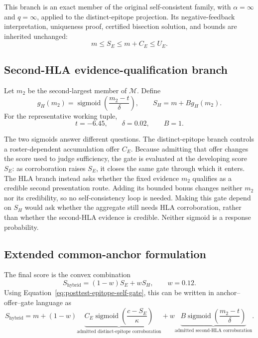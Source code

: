 \documentclass[11pt]{article}
\newcommand{\sigmoid}{\operatorname{sigmoid}}
\begin{document}
This branch is an exact member of the original self-consistent family, with
$\alpha=\infty$ and $q=\infty$, applied to the distinct-epitope projection.
Its negative-feedback interpretation, uniqueness proof, certified bisection
solution, and bounds are inherited unchanged:
\begin{equation}
m\leq S_E\leq m+C_E\leq U_E.
\label{eq:posttest-epitope-bounds}
\end{equation}

\subsection{Second-HLA evidence-qualification branch}

Let $m_2$ be the second-largest member of $\mathcal M$. Define
\begin{equation}
g_H(m_2)=\sigmoid\left(\frac{m_2-t}{\delta}\right),
\qquad
S_H=m+B g_H(m_2).
\label{eq:posttest-hla-gate}
\end{equation}
For the representative working tuple,
\begin{equation}
t=-6.45,
\qquad \delta=0.02,
\qquad B=1.
\end{equation}

The two sigmoids answer different questions. The distinct-epitope branch
controls a roster-dependent accumulation offer $C_E$. Because admitting that
offer changes the score used to judge sufficiency, the gate is evaluated at
the developing score $S_E$: as corroboration raises $S_E$, it closes the same
gate through which it enters. The HLA branch instead asks whether the fixed
evidence $m_2$ qualifies as a credible second presentation route. Adding its
bounded bonus changes neither $m_2$ nor its credibility, so no
self-consistency loop is needed. Making this gate depend on $S_H$ would ask
whether the aggregate still needs HLA corroboration, rather than whether the
second-HLA evidence is credible. Neither sigmoid is a response probability.

\subsection{Extended common-anchor formulation}

The final score is the convex combination
\begin{equation}
S_{\mathrm{hybrid}}=(1-w)S_E+wS_H,
\qquad w=0.12.
\label{eq:posttest-hybrid-convex}
\end{equation}
Using Equation~\eqref{eq:posttest-epitope-self-gate}, this can be written in
anchor--offer--gate language as
\begin{equation}
\boxed{
S_{\mathrm{hybrid}}
=m
+(1-w)\underbrace{C_E
  \sigmoid\left(\frac{c-S_E}{\kappa}\right)}_
  {\text{admitted distinct-epitope corroboration}}
+w\underbrace{B
  \sigmoid\left(\frac{m_2-t}{\delta}\right)}_
  {\text{admitted second-HLA corroboration}}.
}
\label{eq:posttest-hybrid-expanded}
\end{equation}
\end{document}
